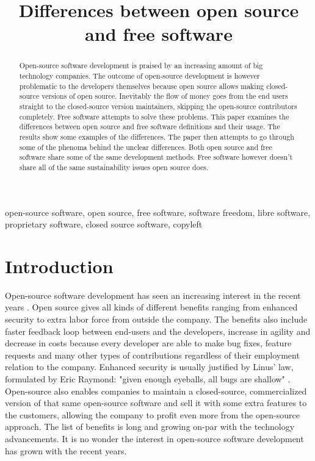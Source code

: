 \documentclass[conference]{IEEEtran}
\begin{document}
\title{Differences between open source and free software}

\author{
}

\maketitle

\begin{abstract}
Open-source software development is praised by an increasing amount of big technology companies. The outcome of open-source development is however problematic to the developers themselves because open source allows making closed-source versions of open source. Inevitably the flow of money goes from the end users straight to the closed-source version maintainers, skipping the open-source contributors completely. Free software attempts to solve these problems. This paper examines the differences between open source and free software definitions and their usage. The results show some examples of the differences. The paper then attempts to go through some of the phenoma behind the unclear differences. Both open source and free software share some of the same development methods. Free software however doesn't share all of the same sustainability issues open source does.
\end{abstract}

\begin{IEEEkeywords}
	open-source software, open source, free software, software freedom, libre software, proprietary software, closed source software, copyleft
\end{IEEEkeywords}

\section{Introduction}
Open-source software development has seen an increasing interest in the recent years \cite{openvsclosed}. Open source gives all kinds of different benefits ranging from enhanced security to extra labor force from outside the company. The benefits also include faster feedback loop between end-users and the developers, increase in agility and decrease in costs because every developer are able to make bug fixes, feature requests and many other types of contributions regardless of their employment relation to the company. Enhanced security is usually justified by Linus' law, formulated by Eric Raymond: "given enough eyeballs, all bugs are shallow" \cite{raymond1999cathedral}.
Open-source also enables companies to maintain a closed-source, commercialized version of that same open-source software and sell it with some extra features to the customers, allowing the company to profit even more from the open-source approach. The list of benefits is long and growing on-par with the technology advancements. It is no wonder the interest in open-source software development has grown with the recent years.
\end{document}
